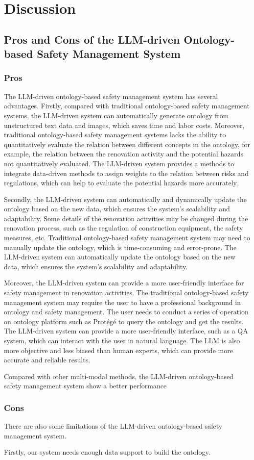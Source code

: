 \section*{Discussion}
\label{sec:discussion}
\subsection*{Pros and Cons of the LLM-driven Ontology-based Safety Management System}
\subsubsection{Pros}
The LLM-driven ontology-based safety management system has several advantages.
Firstly, compared with traditional ontology-based safety management systems, 
the LLM-driven system can automatically generate ontology from unstructured text data and images, which saves time and labor costs.
Moreover, traditional ontology-based safety management systems lacks the ability to quantitatively evaluate the relation between 
different concepts in the ontology, for example, the relation between the renovation activity and the potential hazards not quantitatively evaluated.
The LLM-driven system provides a methods to integrate data-driven methods to assign weights to the relation between risks and regulations,
which can help to evaluate the potential hazards more accurately.

Secondly, the LLM-driven system can automatically and dynamically update the ontology based on the new data, which ensures the system's scalability and adaptability.
Some details of the renovation activities may be changed during the renovation process, such as the regulation of construction equipment, the safety measures, etc.
Traditional ontology-based safety management system may need to manually update the ontology, which is time-consuming and error-prone.
The LLM-driven system can automatically update the ontology based on the new data, which ensures the system's scalability and adaptability.

Moreover, the LLM-driven system can provide a more user-friendly interface for safety management in renovation activities.
The traditional ontology-based safety management system may require the user to have a professional background in ontology and safety management.
The user needs to conduct a series of operation on ontology platform such as Protégé to query the ontology and get the results.
The LLM-driven system can provide a more user-friendly interface, such as a QA system, which can interact with the user in natural language.
The LLM is also more objective and less biased than human experts, which can provide more accurate and reliable results.

Compared with other multi-modal methods, the LLM-driven ontology-based safety management system show a better performance
\subsubsection{Cons}
There are also some limitations of the LLM-driven ontology-based safety management system.

Firstly, our system needs enough data support to build the ontology.